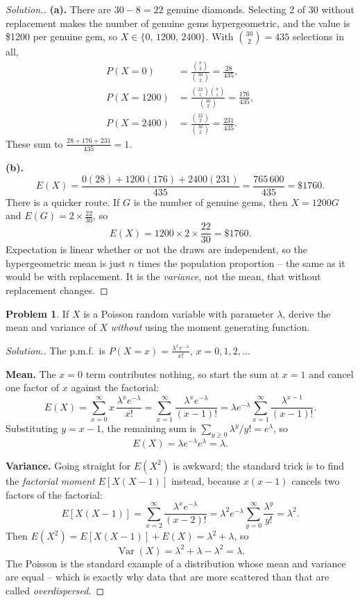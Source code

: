 \documentclass[12pt,a4paper]{report}
\theoremstyle{definition}
\theoremstyle{plain}
\theoremstyle{definition}
\newtheorem{problemx}{Problem}[section]
\newenvironment{problem}{\begin{problemx}}{\end{problemx}}
\newenvironment{solution}
  {\renewcommand{\qedsymbol}{}\begin{proof}[\textit{Solution}.]}
  {\end{proof}}
\begin{document}
\begin{solution}
\textbf{(a).} There are $30-8 = 22$ genuine diamonds. Selecting 2 of 30 without
replacement makes the number of genuine gems hypergeometric, and the value is \$1200 per
genuine gem, so $X\in\{0,\,1200,\,2400\}$. With $\binom{30}{2} = 435$ selections in all,
\begin{align*}
P(X=0) &= \frac{\binom{8}{2}}{\binom{30}{2}} = \frac{28}{435},\\
P(X=1200) &= \frac{\binom{22}{1}\binom{8}{1}}{\binom{30}{2}} = \frac{176}{435},\\
P(X=2400) &= \frac{\binom{22}{2}}{\binom{30}{2}} = \frac{231}{435}.
\end{align*}
These sum to $\tfrac{28+176+231}{435} = 1$.

\textbf{(b).}
\[E(X) = \frac{0(28)+1200(176)+2400(231)}{435} = \frac{765\,600}{435} = \$1760.\]
There is a quicker route. If $G$ is the number of genuine gems, then $X = 1200G$ and
$E(G) = 2\times\tfrac{22}{30}$, so
\[E(X) = 1200\times 2\times\frac{22}{30} = \$1760.\]
Expectation is linear whether or not the draws are independent, so the hypergeometric
mean is just $n$ times the population proportion -- the same as it would be with
replacement. It is the \emph{variance}, not the mean, that without replacement changes.
\end{solution}

\begin{problem}
If $X$ is a Poisson random variable with parameter $\lambda$, derive the mean and variance
of $X$ \emph{without} using the moment generating function.
\end{problem}

\begin{solution}
The p.m.f.\ is $P(X=x) = \frac{\lambda^{x}e^{-\lambda}}{x!}$, $x = 0,1,2,\ldots$

\textbf{Mean.} The $x=0$ term contributes nothing, so start the sum at $x=1$ and cancel
one factor of $x$ against the factorial:
\[E(X) = \sum_{x=0}^{\infty}x\,\frac{\lambda^{x}e^{-\lambda}}{x!}
 = \sum_{x=1}^{\infty}\frac{\lambda^{x}e^{-\lambda}}{(x-1)!}
 = \lambda e^{-\lambda}\sum_{x=1}^{\infty}\frac{\lambda^{x-1}}{(x-1)!}.\]
Substituting $y = x-1$, the remaining sum is $\sum_{y\geq 0}\lambda^{y}/y! = e^{\lambda}$,
so
\[E(X) = \lambda e^{-\lambda}e^{\lambda} = \lambda.\]

\textbf{Variance.} Going straight for $E(X^{2})$ is awkward; the standard trick is to find
the \emph{factorial moment} $E[X(X-1)]$ instead, because $x(x-1)$ cancels two factors of
the factorial:
\[E[X(X-1)] = \sum_{x=2}^{\infty}\frac{\lambda^{x}e^{-\lambda}}{(x-2)!}
 = \lambda^{2}e^{-\lambda}\sum_{y=0}^{\infty}\frac{\lambda^{y}}{y!} = \lambda^{2}.\]
Then $E(X^{2}) = E[X(X-1)]+E(X) = \lambda^{2}+\lambda$, so
\[\operatorname{Var}(X) = \lambda^{2}+\lambda-\lambda^{2} = \lambda.\]
The Poisson is the standard example of a distribution whose mean and variance are equal --
which is exactly why data that are more scattered than that are called
\emph{overdispersed}.
\end{solution}
\end{document}
